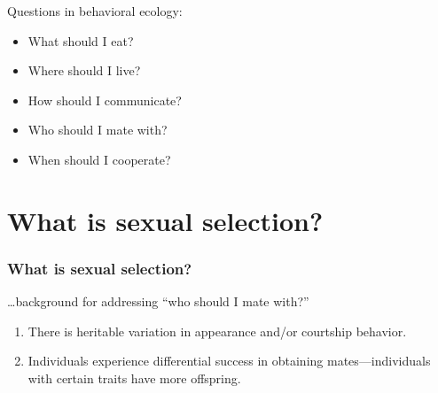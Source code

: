 \begin{frame}[t]
    \begin{adjustwidth}{-2em}{-1.5em}
        Questions in behavioral ecology:

        \begin{itemize}
            \item What should I eat?

                \vspace{4mm}
            \item Where should I live?

                \vspace{4mm}
            \item How should I communicate?

                \vspace{4mm}
            \item Who should I mate with?

                \vspace{4mm}
            \item When should I cooperate?
        \end{itemize}
    \end{adjustwidth}
\end{frame}

\section[What is sexual selection?]{What is sexual selection?}

\begin{noheadline}
\begin{frame}[t]
    \frametitle{What is sexual selection?}
    \begin{adjustwidth}{-2em}{-1.5em}
        \ldots background for addressing ``who should I mate with?''


        \begin{enumerate}
            \item<3-> There is heritable variation in appearance and/or
                courtship behavior.

                \vspace{5mm}
            \item<4-> Individuals experience differential success in obtaining
                mates---individuals with certain traits have more offspring.
        \end{enumerate}
    \end{adjustwidth}
\end{frame}
\end{noheadline}

